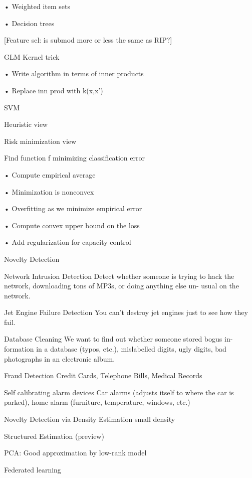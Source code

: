 \documentclass[english]{article}
\begin{document}
• Weighted item sets

• Decision trees

[Feature sel: is submod more or less the same as RIP?]

\eenum 

\item 
 GLM
Kernel trick

• Write algorithm in terms of inner products

• Replace inn prod with k(x,x')
\item 
SVM

Heuristic view

Risk minimization view

Find function f minimizing classification error

• Compute empirical average

• Minimization is nonconvex

• Overfitting as we minimize empirical error

• Compute convex upper bound on the loss

• Add regularization for capacity control

\item

Novelty Detection

Network Intrusion Detection
Detect whether someone is trying to hack the network,
downloading tons of MP3s, or doing anything else un-
usual on the network.

Jet Engine Failure Detection
You can’t destroy jet engines just to see how they fail.

Database Cleaning
We want to find out whether someone stored bogus in-
formation in a database (typos, etc.), mislabelled digits,
ugly digits, bad photographs in an electronic album.

Fraud Detection
Credit Cards, Telephone Bills, Medical Records

Self calibrating alarm devices
Car alarms (adjusts itself to where the car is parked),
home alarm (furniture, temperature, windows, etc.)

Novelty Detection via Density Estimation
small density

Structured Estimation (preview)

PCA: Good approximation by low-rank model

\item Federated learning

\eenum 

\end{document}
